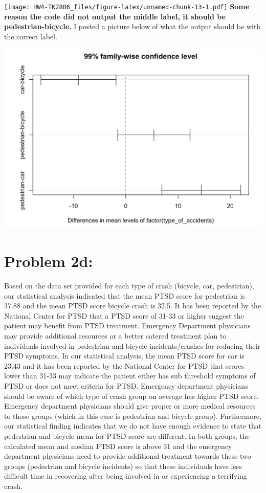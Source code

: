 \documentclass[
]{article}
\begin{document}
\texttt{[image: HW4-TK2886\_files/figure-latex/unnamed-chunk-13-1.pdf]}
\textbf{Some reason the code did not output the middle label, it should
be pedestrian-bicycle.} I posted a picture below of what the output
should be with the correct label.

\begin{center}\includegraphics[width=0.5\linewidth]{problem2c} \end{center}

\newpage

\hypertarget{problem-2d}{%
\section{Problem 2d:}\label{problem-2d}}

Based on the data set provided for each type of crash (bicycle, car,
pedestrian), our statistical analysis indicated that the mean PTSD score
for pedestrian is 37.88 and the mean PTSD score bicycle crash is 32.5.
It has been reported by the National Center for PTSD that a PTSD score
of 31-33 or higher suggest the patient may benefit from PTSD treatment.
Emergency Department physicians may provide additional resources or a
better catered treatment plan to individuals involved in pedestrian and
bicycle incidents/crashes for reducing their PTSD symptoms. In our
statistical analysis, the mean PTSD score for car is 23.43 and it has
been reported by the National Center for PTSD that scores lower than
31-33 may indicate the patient either has sub threshold symptoms of PTSD
or does not meet criteria for PTSD. Emergency department physicians
should be aware of which type of crash group on average has higher PTSD
score. Emergency department physicians should give proper or more
medical resources to those groups (which in this case is pedestrian and
bicycle group). Furthermore, our statistical finding indicates that we
do not have enough evidence to state that pedestrian and bicycle mean
for PTSD score are different. In both groups, the calculated mean and
median PTSD score is above 31 and the emergency department physicians
need to provide additional treatment towards these two groups
(pedestrian and bicycle incidents) so that these individuals have less
difficult time in recovering after being involved in or experiencing a
terrifying crash.
\end{document}
